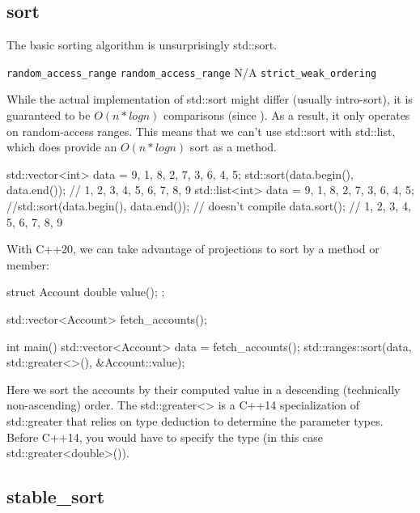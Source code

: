 \subsection{sort}

The basic sorting algorithm is unsurprisingly std::sort.


\constraints
    {\texttt{random\_access\_range}}
    {\texttt{random\_access\_range}}
    {N/A}
    {\texttt{strict\_weak\_ordering}}
    
While the actual implementation of std::sort might differ (usually intro-sort), it is guaranteed to be $O(n*logn)$ comparisons (since ). As a result, it only operates on random-access ranges. This means that we can’t use std::sort with std::list, which does provide an $O(n*logn)$ sort as a method.

\begin{box-note}
\begin{cppcode}
{
    std::vector<int> data = {9, 1, 8, 2, 7, 3, 6, 4, 5};
    std::sort(data.begin(), data.end());
    // 1, 2, 3, 4, 5, 6, 7, 8, 9
}
{
    std::list<int> data = {9, 1, 8, 2, 7, 3, 6, 4, 5};
    //std::sort(data.begin(), data.end()); // doesn't compile
    data.sort();
    // 1, 2, 3, 4, 5, 6, 7, 8, 9
}
\end{cppcode}
\end{box-note}

With C++20, we can take advantage of projections to sort by a method or member:

\begin{box-note}
\begin{cppcode}
struct Account {
    double value();
};

std::vector<Account> fetch_accounts();

int main() {
    std::vector<Account> data = fetch_accounts();
    std::ranges::sort(data, std::greater<>(), &Account::value);
}
\end{cppcode}
\end{box-note}

Here we sort the accounts by their computed value in a descending (technically non-ascending) order. The std::greater<> is a C++14 specialization of std::greater that relies on type deduction to determine the parameter types. Before C++14, you would have to specify the type (in this case std::greater<double>()).


\subsection{stable\_sort}

